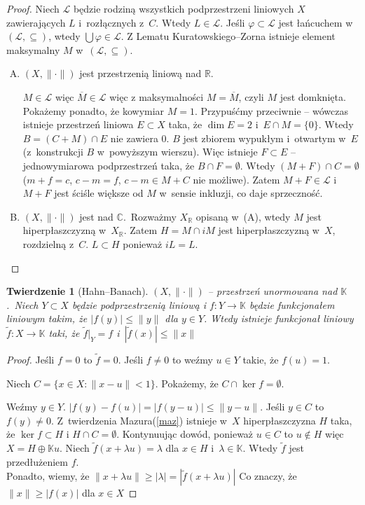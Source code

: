 \documentclass[11pt]{mwrep}
\renewcommand{\[}{\begin{equation}}
\renewcommand{\]}{\end{equation}}
\newcommand{\C}{{\ensuremath{\mathbb C}}}
\newcommand{\R}{{\ensuremath{\mathbb R}}}
\newcommand{\K}{\ensuremath{\mathbb{K}}}
\newcommand{\norm}{\|\cdot\|}
\newtheorem{twr}[subsection]{Twierdzenie}%
\newcounter{numer}
\begin{document}
\begin{proof}
	Niech $\mathcal{L}$ będzie rodziną wszystkich podprzestrzeni liniowych $X$ zawierających $L$ i~rozłącznych z~$C$.
	Wtedy $L \in \mathcal{L}$. Jeśli $\varphi \subset \mathcal{L}$ jest łańcuchem w~$(\mathcal{L},\subseteq)$, wtedy $\bigcup \varphi\in \mathcal{L}$.
	Z Lematu Kuratowskiego--Zorna istnieje element maksymalny $M$ w~$(\mathcal{L}, \subseteq)$.
	\begin{enumerate}[(A)]
		\item $(X,\|\cdot\|)$ jest przestrzenią liniową nad \R.
		
$M\in \mathcal{L}$ więc $\overline{M} \in \mathcal{L}$ więc z maksymalności $M=\overline{M}$, czyli $M$ jest domknięta.
			Pokażemy ponadto, że kowymiar $M=1$. Przypuśćmy przeciwnie -- wówczas istnieje przestrzeń liniowa $E\subset X$ taka, że $\dim E =2$ i~$E\cap M=\{0\}$.
			Wtedy $B=(C+M)\cap E$ nie zawiera 0.
			$B$ jest zbiorem wypukłym i~otwartym w~$E$ (z~konstrukcji $B$ w~powyższym wierszu).
			Więc istnieje $F\subset E$ -- jednowymiarowa podprzestrzeń taka, że $B\cap F = \emptyset$.
			Wtedy $(M+F)\cap C= \emptyset $ ($m+f=c$, $c-m=f$, $c-m \in M+C$ nie możliwe).
			Zatem $M+F \in \mathcal{L}$ i~$M+F$ jest ściśle większe od $M$ w~sensie inkluzji, co daje sprzeczność.
		\item $(X,\norm)$ jest nad \C.~Rozważmy $X_\R$ opisaną w~(A), wtedy $M$ jest hiperpłaszczyzną w~$X_{\R}$.
			Zatem $H=M\cap iM$ jest hiperpłaszczyzną w~$X$, rozdzielną z~$C$. $L\subset H$ ponieważ $iL=L$.
	\end{enumerate}
\end{proof}
\begin{twr}[Hahn--Banach]
	$(X,\norm)$ -- przestrzeń unormowana nad \K.~Niech $Y\subset X$ będzie podprzestrzenią liniową i 
	$f:Y\to \K$ będzie funkcjonałem liniowym takim, że $|f(y)| \le \|y\|$ dla $y\in Y$.
	Wtedy istnieje funkcjonał liniowy $\tilde{f} :X \to \K$ taki, że $\tilde{f}|_Y = f$ i~$|\tilde{f}(x)|\le \|x\|$
\end{twr}
\begin{proof}
  Jeśli $f=0$ to $\tilde{f} = 0$. Jeśli $f\not =0$ to weźmy $u \in Y$  takie, że $f(u)=1$.\par
	Niech $C =\{ x \in X: \|x - u\|<1\}$. Pokażemy, że $C\cap \ker f = \emptyset$.\par
	Weźmy $y\in Y$.
	$|f(y)-f(u)|=|f(y-u)|\le \|y - u\|$. Jeśli $y\in C$ to  $f(y) \not =0$.
	Z~{twierdzenia Mazura(\ref{maz})} istnieje w~$X$ hiperpłaszczyzna $H$ taka, że $\ker f\subset H$ i $H\cap C = \emptyset$.
	Kontynuując dowód, ponieważ $u\in C$ to $u \not \in H$ więc $X=H\oplus \K u$.
	Niech $\tilde{f}(x+\lambda u) = \lambda$ dla $x\in H$ i~$\lambda \in \K$. Wtedy $\tilde{f}$ jest  przedłużeniem $f$.\\
	Ponadto, wiemy, że $\|x +\lambda u\|\ge |\lambda| = |\tilde{f} (x+\lambda u)|$ Co znaczy, że $\|x\| \ge |f(x)|$ dla $x\in X$
\end{proof}
\end{document}
